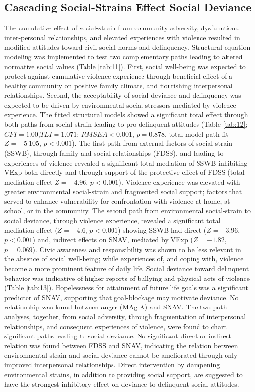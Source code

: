 \documentclass[utf8]{article}
\begin{document}
\subsection*{Cascading Social-Strains Effect Social Deviance}
The cumulative effect of social-strain from community adversity, dysfunctional inter-personal relationships, and elevated experiences with violence resulted in modified attitudes toward civil social-norms and delinquency. Structural equation modeling was implemented to test two complementary paths leading to altered normative social values (Table \ref{tab:11}). First, social well-being was expected to protect against cumulative violence experience through beneficial effect of a healthy community on positive family climate, and flourishing interpersonal relationships. Second, the acceptability of social deviance and delinquency was expected to be driven by environmental social stressors mediated by violence experience. The fitted structural models showed a significant total effect through both paths from social strain leading to pro-delinquent attitudes (Table \ref{tab:12}; $CFI=1.00$,$TLI=1.071$; $RMSEA<0.001$, $p=0.878$, total model path fit $Z=-5.105$, $p<0.001$). The first path from external factors of social strain (SSWB), through family and social relationships (FDSS), and leading to experiences of violence revealed a significant total mediation of SSWB inhibiting VExp both directly and through support of the protective effect of FDSS (total mediation effect $Z=-4.96$, $p<0.001$). Violence experience was elevated with greater environmental social-strain and fragmented social support; factors that served to enhance vulnerability for confrontation with violence at home, at school, or in the community. The second path from environmental social-strain to social deviance, through violence experience, revealed a significant total mediation effect  ($Z=-4.6$, $p<0.001$) showing SSWB had direct ($Z=-3.96$, $p<0.001$) and, indirect effects on SNAV, mediated by VExp ($Z=-1.82$, $p=0.069$). Civic awareness and responsibility was shown to be less relevant in the absence of social well-being; while experiences of, and coping with, violence become a more prominent feature of daily life. Social deviance toward delinquent behavior was indicative of higher reports of bullying  and physical acts of violence (Table \ref{tab:13}). Hopelessness for attainment of future life goals was a significant predictor of SNAV, supporting that goal-blockage may motivate deviance. No relationship was found between anger (MAg-A) and SNAV. The two path analyses, together, from social adversity, through fragmentation of interpersonal relationships, and consequent experiences of violence, were found to chart significant paths leading to social deviance. No significant direct or indirect relation was found between FDSS and SNAV, indicating the relation between environmental strain and social deviance cannot be ameliorated through only improved interpersonal relationships. Direct intervention by dampening environmental strains, in addition to providing social support, are suggested to have the strongest inhibitory effect on deviance to delinquent social attitudes. 
\end{document}
